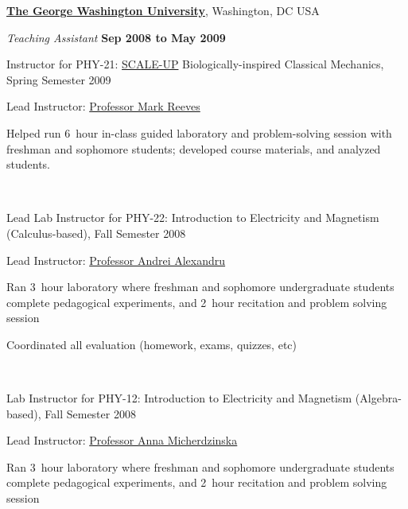 \documentclass[10pt]{article}
\newenvironment{outerlist}[1][\enskip\textbullet]%
        {\begin{itemize}[#1]}{\end{itemize}%
         \vspace{-.6\baselineskip}}
\newenvironment{innerlist}[1][\enskip\textbullet]%
        {\begin{compactitem}[#1]}{\end{compactitem}}
\begin{document}
\href{http://www.gwu.edu}{\textbf{The George Washington University}},
Washington, DC USA
\begin{outerlist}

\item[] \textit{Teaching Assistant}%
    \hfill \textbf{Sep 2008 to May 2009}
    \begin{innerlist}
    \item Instructor for PHY-21: \href{http://www.ncsu.edu/PER/scaleup.html}{SCALE-UP} Biologically-inspired Classical Mechanics, Spring Semester 2009
        \begin{innerlist}
            \item Lead Instructor: \href{http://www.gwu.edu/~condmat/CME/reeves.html}{Professor Mark Reeves}

            \item Helped run 6~hour in-class guided laboratory and problem-solving session with freshman and sophomore students; developed course materials, and analyzed students.
        \end{innerlist}~
        \item Lead Lab Instructor for PHY-22: Introduction to Electricity and Magnetism (Calculus-based), Fall Semester 2008
        \begin{innerlist}
        \item Lead Instructor: \href{http://physics.columbian.gwu.edu/andrei-alexandru}{Professor Andrei Alexandru}
            \item Ran 3~hour laboratory where freshman and sophomore undergraduate
                students complete pedagogical experiments, and 2~hour recitation and problem solving session
            \item Coordinated all evaluation (homework, exams, quizzes, etc)
        \end{innerlist}~

     \item Lab Instructor for PHY-12: Introduction to Electricity and Magnetism (Algebra-based), Fall Semester 2008
        \begin{innerlist}
	   \item Lead Instructor: \href{https://www.linkedin.com/pub/anna-micherdzinska/18/9a6/4a9}{Professor Anna Micherdzinska}
            \item Ran 3~hour laboratory where freshman and sophomore undergraduate
                students complete pedagogical experiments, and 2~hour recitation and problem solving session
        \end{innerlist}~

    \end{innerlist}
\end{outerlist}
\end{document}

